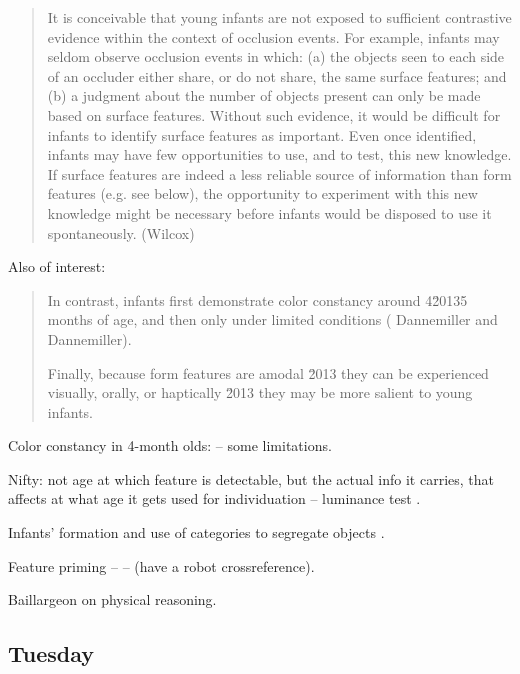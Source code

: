 \begin{quote}

It is conceivable that young infants are not exposed to sufficient
contrastive evidence within the context of occlusion events. For
example, infants may seldom observe occlusion events in which: (a) the
objects seen to each side of an occluder either share, or do not
share, the same surface features; and (b) a judgment about the number
of objects present can only be made based on surface features. Without
such evidence, it would be difficult for infants to identify surface
features as important. Even once identified, infants may have few
opportunities to use, and to test, this new knowledge. If surface
features are indeed a less reliable source of information than form
features (e.g. see below), the opportunity to experiment with this new
knowledge might be necessary before infants would be disposed to use
it spontaneously. (Wilcox)

\end{quote}



Also of interest:

\begin{quote}

In contrast, infants first demonstrate color constancy around 4\u20135
months of age, and then only under limited conditions ( Dannemiller
and Dannemiller).

Finally, because form features are amodal \u2013 they can be
experienced visually, orally, or haptically \u2013 they may be more
salient to young infants.

\end{quote}

Color constancy in 4-month olds: \cite{dannemiller87test} -- some 
limitations.

Nifty: not age at which feature is detectable, but the actual
info it carries, that affects at what age it gets used for
individuation -- luminance test \cite{woods05infants}.

Infants' formation and use of categories to segregate objects 
\cite{needham05infants}.

Feature priming -- \cite{wilcox04priming}
--
(have a robot crossreference).

Baillargeon on physical reasoning.


\subsection{Tuesday}


